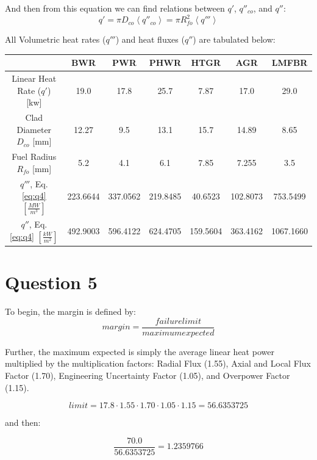 \documentclass{article}
\begin{document}
And then from this equation we can find relations between $q'$, $q''_{co}$, and $q''$:
\begin{equation}
    q' = \pi D_{co} \left< q''_{co} \right> = \pi R_{fo}^2 \left< q''' \right>
    \label{eq:q4}
\end{equation}

All Volumetric heat rates ($q'''$) and heat fluxes ($q''$) are tabulated below:
\vspace{20pt}

\begin{tabular}{|c|c|c|c|c|c|c|}
    \toprule
     & BWR & PWR & PHWR & HTGR & AGR & LMFBR \\
     \midrule
     Linear Heat Rate ($q'$) [kw] & 19.0 & 17.8 & 25.7 & 7.87 & 17.0 & 29.0\\
     Clad Diameter $D_{co}$ [mm] & 12.27 & 9.5 & 13.1 & 15.7 & 14.89 & 8.65\\
     Fuel Radius $R_{fo}$ [mm] & 5.2 & 4.1 & 6.1 & 7.85 & 7.255 & 3.5 \\ 
     \midrule
     $q'''$, Eq. \ref{eq:q4} $\left[\frac{MW}{m^3}\right]$ & 223.6644 & 337.0562 & 219.8485 &  40.6523 & 102.8073 & 753.5499 \\
     $q''$, Eq. \ref{eq:q4} $\left[\frac{kW}{m^2}\right]$ & 492.9003 &  596.4122 & 624.4705 & 159.5604 & 363.4162 & 1067.1660 \\ 
     \bottomrule
         
\end{tabular}

\vspace{20pt}
\section*{Question 5}

To begin, the margin is defined by:
\begin{equation}
    margin = \frac{failure limit}{maximum expected}
\end{equation}

Further, the maximum expected is simply the average linear heat power multiplied by the multiplication factors: Radial Flux (1.55), Axial and Local Flux Factor (1.70), Engineering Uncertainty Factor (1.05), and Overpower Factor (1.15).

\begin{equation}
    limit = 17.8 \cdot 1.55 \cdot 1.70 \cdot 1.05 \cdot 1.15 = 56.6353725
\end{equation}

and then: 

\begin{equation}
    \frac{70.0}{56.6353725} = 1.2359766
\end{equation}
\end{document}
